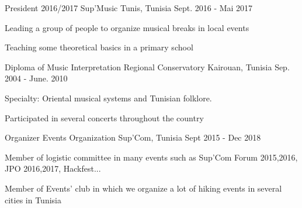

\begin{cventries}

  \cventry
    {President 2016/2017} %
    {Sup'Music} %
    {Tunis, Tunisia } %
    {Sept. 2016 - Mai 2017} %
    {
      \begin{cvitems} %
        \item {Leading a group of people to organize musical breaks in local events}
        \item {Teaching some theoretical basics in a primary school }
      \end{cvitems}
    }

  \cventry
    {Diploma of Music Interpretation} %
    {Regional Conservatory} %
    {Kairouan, Tunisia} %
    {Sep. 2004 - June. 2010} %
    {
      \begin{cvitems} %
        \item {Specialty: Oriental musical systems and Tunisian folklore.}
        \item {Participated in several concerts throughout the country}
      \end{cvitems}
    }

 \cventry
    {Organizer} %
    {Events Organization} %
    {Sup'Com, Tunisia} %
    {Sept 2015 - Dec 2018} %
    {
      \begin{cvitems} %
        \item {Member of logistic committee in many events such as Sup'Com Forum 2015,2016, JPO 2016,2017, Hackfest... }
        \item {Member of Events' club in which we organize a lot of hiking events in several cities in Tunisia}
      \end{cvitems}
    }

\end{cventries}
